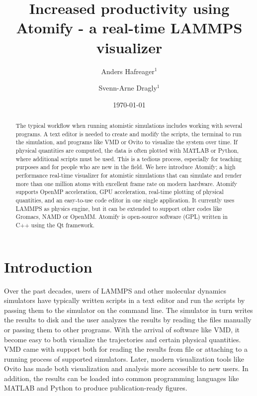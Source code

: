 \documentclass[aps,pre,twocolumn,letterpaper,floatfix,nofootinbib]{revtex4}
\begin{document}
\title{Increased productivity using Atomify - a real-time LAMMPS visualizer}
\author{Anders Hafreager$^1$}
\author{Svenn-Arne Dragly$^{1}$}
\date{\today}


\begin{abstract}
%
The typical workflow when running atomistic simulations includes working with several programs.
A text editor is needed to create and modify the scripts, the terminal to run the simulation, and programs like VMD or Ovito to visualize the system over time.
If physical quantities are computed, the data is often plotted with MATLAB or Python, where additional scripts must be used.
This is a tedious process, especially for teaching purposes and for people who are new in the field.
We here introduce Atomify; a high performance real-time visualizer for atomistic simulations that can simulate and render more than one million atoms with excellent frame rate on modern hardware.
Atomify supports OpenMP acceleration, GPU acceleration, real-time plotting of physical quantities, and an easy-to-use code editor in one single application.
It currently uses LAMMPS as physics engine, but it can be extended to support other codes like Gromacs, NAMD or OpenMM.
Atomify is open-source software (GPL) written in C++ using the Qt framework.
%
\end{abstract}

\maketitle

\section{Introduction}

Over the past decades, users of LAMMPS and other molecular dynamics simulators have
typically written scripts in a text editor and run the scripts by passing them to the simulator
on the command line.
The simulator in turn writes the results to disk and the user analyzes the results
by reading the files manually or passing them to other programs.
With the arrival of software like VMD,
it become easy to both visualize the trajectories and certain physical quantities.
VMD came with support both for reading the results from file or attaching to a
running process of supported simulators.
Later, modern visualization tools like Ovito has made both visualization and analysis more
accessible to new users.
In addition, the results can be loaded into common programming languages like MATLAB and Python
to produce publication-ready figures.
\end{document}
